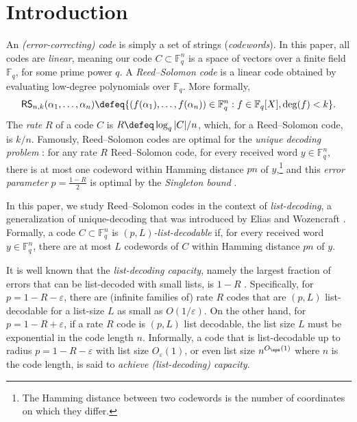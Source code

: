 \documentclass{article}[11pt]
\def\RS{\mathsf{RS}}
\begin{document}
\section{Introduction}

An \emph{(error-correcting) code} is simply a set of strings (\emph{codewords}).
In this paper, all codes are \emph{linear}, meaning our code $C \subset \mathbb{F}_q^n$ is a space of vectors over a finite field $\mathbb{F}_q$, for some prime power $q$. 
A \emph{Reed--Solomon code} \cite{RS60} is a linear code obtained by evaluating low-degree polynomials over $\mathbb{F}_q$. More formally,
\begin{align}
  \RS_{n,k}(\alpha_1,\dots,\alpha_n) \defeq \{(f(\alpha_1),\dots,f(\alpha_n))\in\mathbb{F}_q^n : f\in \mathbb{F}_q[X], \deg(f) < k\}.
\end{align}
The \emph{rate} $R$ of a code $C$ is $R\defeq \log_q|C|/n$, which, for a Reed--Solomon code, is $k/n$.
Famously, Reed--Solomon codes are optimal for the \emph{unique decoding problem} \cite{RS60}: for any rate $R$ Reed--Solomon code, for every received word $y\in\mathbb{F}_q^n$, there is at most one codeword within Hamming distance $pn$ of $y$,\footnote{The Hamming distance between two codewords is the number of coordinates on which they differ.} and this \emph{error parameter} $p=\frac{1-R}{2}$ is optimal by the \emph{Singleton bound} \cite{Singleton64}.

In this paper, we study Reed--Solomon codes in the context of \emph{list-decoding}, a generalization of unique-decoding that was introduced by Elias and Wozencraft \cite{Elias57,Wozencraft58}. 
Formally, a code $C \subset \mathbb{F}_q^n$ is \emph{$(p,L)$-list-decodable} if, for every received word $y\in\mathbb{F}_q^n$, there are at most $L$ codewords of $C$ within Hamming distance $pn$ of $y$. 

It is well known that the \emph{list-decoding capacity}, namely the largest fraction of errors that can be list-decoded with small lists, is $1-R$ \cite[Theorem 7.4.1]{GRS22}. Specifically, for $p=1-R-\varepsilon$, there are (infinite families of) rate $R$ codes that are $(p,L)$ list-decodable for a list-size $L$ as small as $O(1/\varepsilon)$. On the other hand, for $p=1-R+\varepsilon$, if a rate $R$ code is $(p,L)$ list decodable, the list size $L$ must be exponential in the code length $n$.
Informally, a code that is list-decodable up to radius $p=1-R-\varepsilon$ with list size $O_\varepsilon(1)$, or even list size $n^{O_\eps(1)}$ where $n$ is the code length, is said to \emph{achieve (list-decoding) capacity}. 
\end{document}
